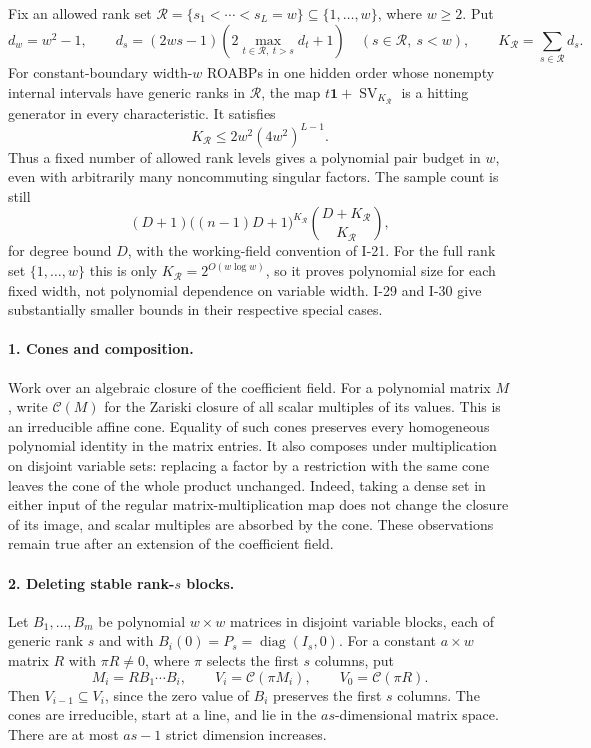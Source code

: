 \documentclass[11pt,a4paper]{article}
\theoremstyle{definition}\newtheorem{definition}{Definition}
\begin{document}
Fix an allowed rank set
$\mathcal R=\{s_1<\cdots<s_L=w\}\subseteq\{1,\ldots,w\}$,
where $w\ge2$.  Put
\[
 d_w=w^2-1,\qquad
 d_s=(2ws-1)\left(2\max_{t\in\mathcal R,\ t>s}d_t+1\right)
       \quad(s\in\mathcal R,\ s<w),
 \qquad K_{\mathcal R}=\sum_{s\in\mathcal R}d_s.
 \tag{I.50}
\]
For constant-boundary width-$w$ ROABPs in one hidden order
whose nonempty internal intervals have generic ranks in
$\mathcal R$, the map $t\mathbf1+\operatorname{SV}_{K_{\mathcal R}}$
is a hitting generator in every characteristic.  It satisfies
\[
 K_{\mathcal R}\le2w^2(4w^2)^{L-1}.
 \tag{I.51}
\]
Thus a fixed number of allowed rank levels gives a polynomial
pair budget in $w$, even with arbitrarily many noncommuting
singular factors.  The sample count is still
\[
 (D+1)\bigl((n-1)D+1\bigr)^{K_{\mathcal R}}
                  \binom{D+K_{\mathcal R}}{K_{\mathcal R}},
 \tag{I.52}
\]
for degree bound $D$, with the working-field convention of
I-21.  For the full rank set $\{1,\ldots,w\}$ this is only
$K_{\mathcal R}=2^{O(w\log w)}$, so it proves polynomial size
for each fixed width, not polynomial dependence on variable
width.  I-29 and I-30 give substantially smaller bounds in
their respective special cases.

\paragraph{1. Cones and composition.}
Work over an algebraic closure of the coefficient field.
For a polynomial matrix $M$, write $\mathcal C(M)$ for the
Zariski closure of all scalar multiples of its values.
This is an irreducible affine cone.  Equality of such cones
preserves every homogeneous polynomial identity in the matrix
entries.  It also composes under multiplication on disjoint
variable sets: replacing a factor by a restriction with the
same cone leaves the cone of the whole product unchanged.
Indeed, taking a dense set in either input of the regular
matrix-multiplication map does not change the closure of its
image, and scalar multiples are absorbed by the cone.
These observations remain true after an extension of the
coefficient field.

\paragraph{2. Deleting stable rank-$s$ blocks.}
Let $B_1,\ldots,B_m$ be polynomial $w\times w$ matrices in
disjoint variable blocks, each of generic rank $s$ and with
$B_i(0)=P_s=\operatorname{diag}(I_s,0)$.
For a constant $a\times w$ matrix $R$ with $\pi R\ne0$,
where $\pi$ selects the first $s$ columns, put
\[
 M_i=RB_1\cdots B_i,\qquad
 V_i=\mathcal C(\pi M_i),\qquad V_0=\mathcal C(\pi R).
\]
Then $V_{i-1}\subseteq V_i$, since the zero value of $B_i$
preserves the first $s$ columns.  The cones are irreducible,
start at a line, and lie in the $as$-dimensional matrix space.
There are at most $as-1$ strict dimension increases.
\end{document}

